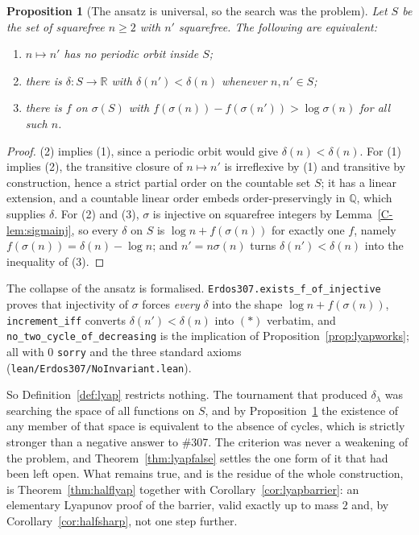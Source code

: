 \documentclass[11pt]{article}
\newtheorem{proposition}[theorem]{Proposition}
\theoremstyle{definition}
\begin{document}
\begin{proposition}[The ansatz is universal, so the search was the problem]\label{prop:lyapuniversal}
Let $S$ be the set of squarefree $n\ge2$ with $n'$ squarefree. The following are equivalent:
\begin{enumerate}[label=\textup{(\arabic*)},leftmargin=2.2em]
\item $n\mapsto n'$ has no periodic orbit inside $S$;
\item there is $\delta:S\to\mathbb{R}$ with $\delta(n')<\delta(n)$ whenever $n,n'\in S$;
\item there is $f$ on $\sigma(S)$ with $f(\sigma(n))-f(\sigma(n'))>\log\sigma(n)$ for all such $n$.
\end{enumerate}
\end{proposition}
\begin{proof}
(2) implies (1), since a periodic orbit would give $\delta(n)<\delta(n)$. For (1) implies (2), the
transitive closure of $n\mapsto n'$ is irreflexive by (1) and transitive by construction, hence a
strict partial order on the countable set $S$; it has a linear extension, and a countable linear
order embeds order-preservingly in $\mathbb{Q}$, which supplies $\delta$. For (2) and (3), $\sigma$
is injective on squarefree integers by Lemma~\ref{C-lem:sigmainj}, so every $\delta$ on $S$ is
$\log n+f(\sigma(n))$ for exactly one $f$, namely $f(\sigma(n))=\delta(n)-\log n$; and $n'=n\sigma(n)$
turns $\delta(n')<\delta(n)$ into the inequality of (3).
\end{proof}

The collapse of the ansatz is formalised. \texttt{Erdos307.exists\_f\_of\_injective} proves that
injectivity of $\sigma$ forces \emph{every} $\delta$ into the shape $\log n+f(\sigma(n))$,
\texttt{increment\_iff} converts $\delta(n')<\delta(n)$ into $(\ast)$ verbatim, and
\texttt{no\_two\_cycle\_of\_decreasing} is the implication of
Proposition~\ref{prop:lyapworks}; all with $0$ \texttt{sorry} and the three standard axioms
\textup{(\texttt{lean/Erdos307/NoInvariant.lean})}.

So Definition~\ref{def:lyap} restricts nothing. The tournament that produced $\delta_\lambda$ was
searching the space of all functions on $S$, and by Proposition~\ref{prop:lyapuniversal} the
existence of any member of that space is equivalent to the absence of cycles, which is strictly
stronger than a negative answer to \#307. The criterion was never a weakening of the problem, and
Theorem~\ref{thm:lyapfalse} settles the one form of it that had been left open. What remains true,
and is the residue of the whole construction, is Theorem~\ref{thm:halflyap} together with
Corollary~\ref{cor:lyapbarrier}: an elementary Lyapunov proof of the barrier, valid exactly up to
mass $2$ and, by Corollary~\ref{cor:halfsharp}, not one step further.
\end{document}
